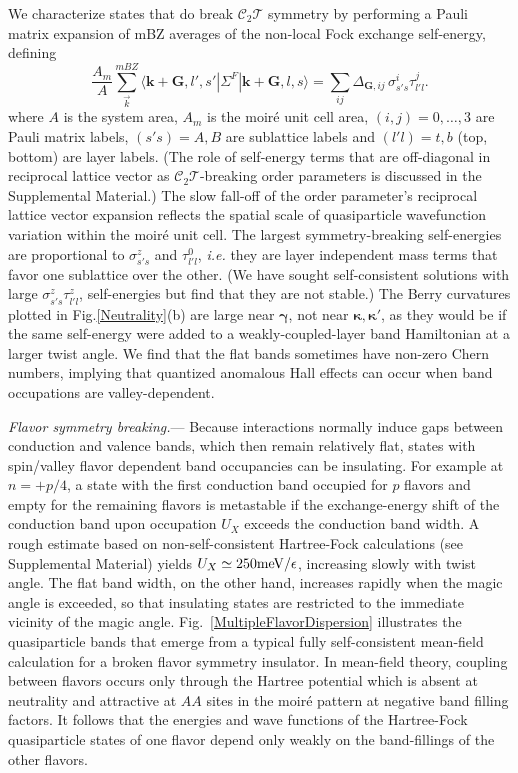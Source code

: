 \documentclass[aps,prl,reprint,amssymb,groupedaddress,twocolumn]{revtex4}
\newcommand{\CT}{$\mathcal{C}_2\mathcal{T}$ }
\newcommand{\CTs}{$\mathcal{C}_2\mathcal{T}$}
\begin{document}
We characterize states that do break \CT symmetry
by performing a Pauli matrix expansion of mBZ averages 
of the non-local Fock exchange self-energy, defining
\begin{equation}
\frac{A_{m}}{A} \sum_{\vec{k}}^{mBZ} \langle \bm{k}+\bm{G}, l',s' |\Sigma^{F} | \bm{k}+\bm{G}, l,s\rangle = 
\sum_{ij} \Delta_{\bm{G},ij}  \, \sigma^i_{s's} \tau^j_{l'l}. 
\label{c2t}
\end{equation}
where $A$ is the system area, $A_{m}$ is the moir\'e  unit cell area,
$(i,j)=0,\ldots,3$ are Pauli matrix labels, $(s's)=A,B$ are sublattice 
labels and $(l'l)=t,b$ (top, bottom) are layer labels.  
(The role of self-energy terms that are off-diagonal in reciprocal lattice vector 
as \CTs-breaking order parameters
is discussed in the Supplemental Material.)
The slow fall-off of the order parameter's reciprocal lattice vector expansion reflects the spatial scale of 
quasiparticle wavefunction variation within the moir\'e unit cell.  The largest symmetry-breaking self-energies
are proportional to $\sigma^z_{s's}$ and $\tau^0_{l'l}$, 
{\it i.e.} they are layer independent mass terms that favor one sublattice over the other.
(We have sought self-consistent solutions with large $\sigma^z_{s's} \tau^z_{l'l}$, self-energies 
but find that they are not stable.)  
The Berry curvatures plotted in Fig.\ref{Neutrality}(b)
are large near $\bm{\gamma}$, not near $\bm{\kappa}, \bm{\kappa'}$, as they
would be if the same self-energy were added to a weakly-coupled-layer 
band Hamiltonian at a larger twist angle.
We find that the flat bands sometimes have non-zero Chern numbers, implying 
that quantized anomalous Hall effects can occur \cite{ZhangChern} when band occupations 
are valley-dependent.  

{\em Flavor symmetry breaking.}--- Because interactions normally induce gaps between conduction and 
valence bands, which then remain relatively flat, states with spin/valley flavor dependent band occupancies can be 
insulating. For example at $n=+p/4$, a state with the first conduction band occupied for $p$ flavors and empty for 
the remaining flavors is metastable if the exchange-energy shift of the conduction band upon
 occupation $U_X$ exceeds the conduction band width.  A rough estimate based on non-self-consistent 
 Hartree-Fock calculations (see Supplemental Material) yields $U_X \simeq 250 {\rm meV}/\epsilon$,
 increasing slowly with twist angle.  The flat band width, on the other hand, increases rapidly when the 
 magic angle is exceeded, so that insulating states are restricted to the 
immediate vicinity of the magic angle.  Fig.~\ref{MultipleFlavorDispersion} illustrates the 
quasiparticle bands that emerge from a typical fully self-consistent 
mean-field calculation for a broken flavor symmetry insulator.  
In mean-field theory, coupling between flavors occurs
only through the Hartree potential which is absent at neutrality
and attractive at $AA$ sites in the moir\'e pattern at negative band filling factors.  It follows that 
the energies and wave functions of the Hartree-Fock quasiparticle states of one flavor depend 
only weakly on the band-fillings of the other flavors.
\end{document}
